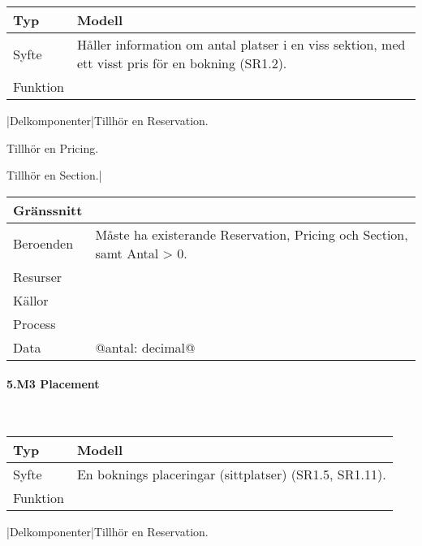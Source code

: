 \documentclass[a4paper, twoside, 11pt, titlepage]{article}
\begin{document}
			\begin {table} [ht] \begin{tabular} {  p{3.5cm} p{9.6cm} }
				\hline
				Typ & Modell  \\
				\hline
				Syfte & Håller information om antal platser i en viss sektion, med ett visst pris för en bokning (SR1.2).  \\
				\hline
				Funktion &   \\
				\hline
			\end{tabular} \end{table} \FloatBarrier
			\vspace{6mm}

			|Delkomponenter|Tillhör en Reservation.

			Tillhör en Pricing.

			Tillhör en Section.|

			\begin {table} [ht] \begin{tabular} {  p{3.5cm} p{9.6cm} }
				\hline
				Gränssnitt &   \\
				\hline
				Beroenden & Måste ha existerande Reservation, Pricing och Section, samt Antal > 0.  \\
				\hline
				Resurser &   \\
				\hline
				Källor &   \\
				\hline
				Process &   \\
				\hline
				Data & @antal: decimal@  \\
				\hline
			\end{tabular} \end{table} \FloatBarrier


			\paragraph{5.M3 Placement}\

			\begin {table} [ht] \begin{tabular} {  p{3.5cm} p{9.6cm} }
				\hline
				Typ & Modell  \\
				\hline
				Syfte & En boknings placeringar (sittplatser) (SR1.5, SR1.11).  \\
				\hline
				Funktion &   \\
				\hline
			\end{tabular} \end{table} \FloatBarrier
			\vspace{6mm}

			|Delkomponenter|Tillhör en Reservation.
\end{document}
